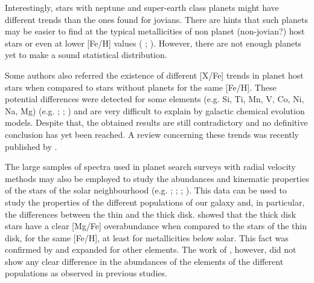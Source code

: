 \documentclass[oldversion]{aa}
\begin{document}
Interestingly, stars with neptune and super-earth class planets might have different trends than the ones found for jovians. There are hints that such planets may be easier to find at the typical metallicities of non planet (non-jovian?) host stars or even at lower [Fe/H] values (\citeauthor{Udry-2006} \citeyear{Udry-2006}; \citeauthor{Sousa-2008} \citeyear{Sousa-2008}). However, there are not enough planets yet to make a sound statistical distribution.

Some authors also referred the existence of different [X/Fe] trends in planet host stars when compared to stars without planets for the same [Fe/H]. These potential differences were detected for some elements (e.g. Si, Ti, Mn, V, Co, Ni, Na, Mg) (e.g. \citeauthor{Bodaghee-2003} \citeyear{Bodaghee-2003}; \citeauthor{Gilli-2006} \citeyear{Gilli-2006};  \citeauthor{Robinson-2006} \citeyear{Robinson-2006}) and are very difficult to explain by galactic chemical evolution models. Despite that, the obtained results are still contradictory and no definitive conclusion has yet been reached. A review concerning these trends was recently published by \citet{Gonzalez-2007}.

The large samples of spectra used in planet search surveys with radial velocity methods may also be employed to study the abundances and  kinematic properties of the stars of the solar neighbourhood (e.g. \citeauthor{Santos-2003} \citeyear{Santos-2003}; \citeauthor{Fischer-2005} \citeyear{Fischer-2005}; \citeauthor{Gilli-2006} \citeyear{Gilli-2006}; \citeauthor{Ecuvillon-2007} \citeyear{Ecuvillon-2007}). This data can be used to study the properties of the different populations of our galaxy and, in particular, the differences between the thin and the thick disk. \citet{Fuhrmann-1998} showed that the thick disk stars have a clear [Mg/Fe] overabundance when compared to the stars of the thin disk, for the same [Fe/H], at least for metallicities below solar. This fact was confirmed by \citet{Bensby-2003} and expanded for other elements. %
The work of \citet{Ecuvillon-2007}, however, did not show any clear difference in the abundances of the elements of the different populations as observed in previous studies. 
\end{document}
